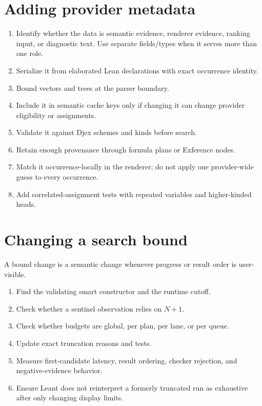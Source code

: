 \documentclass[10pt,letterpaper,oneside]{report}
\begin{document}
\section{Adding provider metadata}

\begin{enumerate}
  \item Identify whether the data is semantic evidence, renderer evidence, ranking input, or diagnostic text. Use separate fields/types when it serves more than one role.
  \item Serialize it from elaborated Lean declarations with exact occurrence identity.
  \item Bound vectors and trees at the parser boundary.
  \item Include it in semantic cache keys only if changing it can change provider eligibility or assignments.
  \item Validate it against Djex schemes and kinds before search.
  \item Retain enough provenance through formula plans or Exference nodes.
  \item Match it occurrence-locally in the renderer; do not apply one provider-wide guess to every occurrence.
  \item Add correlated-assignment tests with repeated variables and higher-kinded heads.
\end{enumerate}

\section{Changing a search bound}

A bound change is a semantic change whenever progress or result order is user-visible.

\begin{enumerate}
  \item Find the validating smart constructor and the runtime cutoff.
  \item Check whether a sentinel observation relies on \(N+1\).
  \item Check whether budgets are global, per plan, per lane, or per queue.
  \item Update exact truncation reasons and tests.
  \item Measure first-candidate latency, result ordering, checker rejection, and negative-evidence behavior.
  \item Ensure Leant does not reinterpret a formerly truncated run as exhaustive after only changing display limits.
\end{enumerate}
\end{document}
